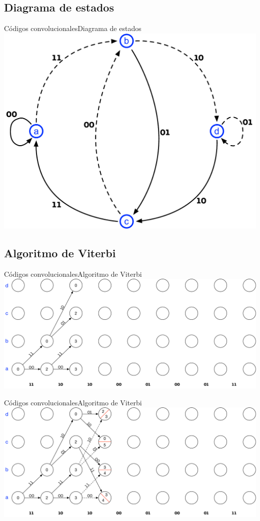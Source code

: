 \documentclass[10pt,compress]{beamer} %
\begin{document}
\subsection{Diagrama de estados}
\begin{frame}{Códigos convolucionales}{Diagrama de estados}
  \centering \includegraphics[width=0.6\linewidth]{Figuras/EstadosCodigoConvolucional.pdf}
\end{frame}

\subsection{Algoritmo de Viterbi}
\begin{frame}{Códigos convolucionales}{Algoritmo de Viterbi}
  \centering \includegraphics[width=0.8\linewidth]{Figuras/Viterbi_1.pdf}
\end{frame}

\begin{frame}{Códigos convolucionales}{Algoritmo de Viterbi}
  \centering \includegraphics[width=0.8\linewidth]{Figuras/Viterbi_2.pdf}
\end{frame}
\end{document}
